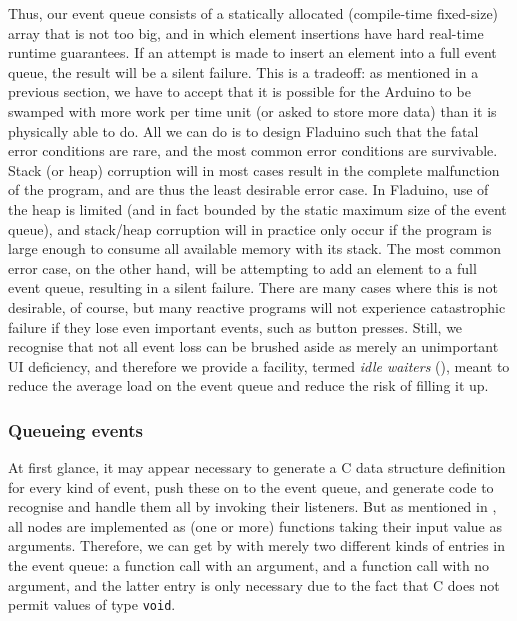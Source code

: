 \documentclass[a4paper, oneside, final]{memoir}
\let\Fref\undefined
\begin{document}
Thus, our event queue consists of a statically allocated (compile-time
fixed-size) array that is not too big, and in which element insertions
have hard real-time runtime guarantees.  If an attempt is made to
insert an element into a full event queue, the result will be a silent
failure.  This is a tradeoff: as mentioned in a previous section, we
have to accept that it is possible for the Arduino to be swamped with
more work per time unit (or asked to store more data) than it is
physically able to do.  All we can do is to design Fladuino such that
the fatal error conditions are rare, and the most common error
conditions are survivable.  Stack (or heap) corruption will in most
cases result in the complete malfunction of the program, and are thus
the least desirable error case.  In Fladuino, use of the heap is
limited (and in fact bounded by the static maximum size of the event
queue), and stack/heap corruption will in practice only occur if the
program is large enough to consume all available memory with its
stack.  The most common error case, on the other hand, will be
attempting to add an element to a full event queue, resulting in a
silent failure.  There are many cases where this is not desirable, of
course, but many reactive programs will not experience catastrophic
failure if they lose even important events, such as button presses.
Still, we recognise that not all event loss can be brushed aside as
merely an unimportant UI deficiency, and therefore we provide a
facility, termed \textit{idle waiters} (\Fref{sec:idle waiters}),
meant to reduce the average load on the event queue and reduce the
risk of filling it up.

\subsubsection{Queueing events}

At first glance, it may appear necessary to generate a C data
structure definition for every kind of event, push these on to the
event queue, and generate code to recognise and handle them all by
invoking their listeners.  But as mentioned in
\Fref{sec:dataflowtranslation}, all nodes are implemented as (one or
more) functions taking their input value as arguments.  Therefore, we
can get by with merely two different kinds of entries in the event
queue: a function call with an argument, and a function call with no
argument, and the latter entry is only necessary due to the fact that
C does not permit values of type \texttt{void}.
\end{document}
